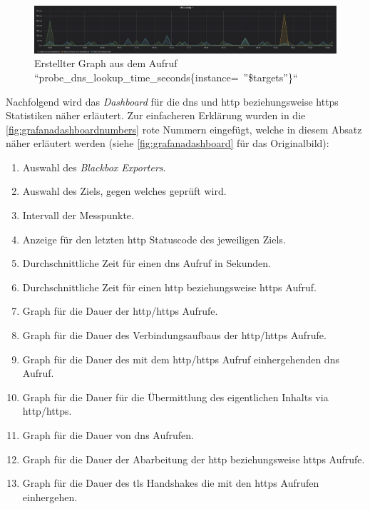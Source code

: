 \documentclass[titlepage]{report}
\begin{document}
\begin{figure}[H]
    \centering
    \includegraphics[width=1.0\textwidth]{figures/grafana_graph.png}
    \caption{Erstellter Graph aus dem Aufruf ``probe\_dns\_lookup\_time\_seconds\{instance=~''\$targets''\}``}\label{fig:grafanagraph}
\end{figure}
Nachfolgend wird das \emph{Dashboard} für die \gls{dns} und \gls{http}
beziehungsweise \gls{https} Statistiken näher erläutert.
Zur einfacheren Erklärung wurden in die
\autoref{fig:grafanadashboardnumbers}
rote Nummern eingefügt, welche in diesem Absatz näher erläutert werden
(siehe \autoref{fig:grafanadashboard} für das Originalbild):
\begin{enumerate}
    \item Auswahl des \emph{Blackbox Exporters}.
    \item Auswahl des Ziels, gegen welches geprüft wird.
    \item Intervall der Messpunkte.
    \item Anzeige für den letzten \gls{http} Statuscode des jeweiligen Ziels.
    \item Durchschnittliche Zeit für einen \gls{dns} Aufruf in Sekunden.
    \item Durchschnittliche Zeit für einen \gls{http} beziehungsweise \gls{https} Aufruf.
    \item Graph für die Dauer der \gls{http}/\gls{https} Aufrufe.
    \item Graph für die Dauer des Verbindungsaufbaus der \gls{http}/\gls{https} Aufrufe.
    \item Graph für die Dauer des mit dem \gls{http}/\gls{https} Aufruf einhergehenden \gls{dns} Aufruf.
    \item Graph für die Dauer für die Übermittlung des eigentlichen Inhalts via \gls{http}/\gls{https}.
    \item Graph für die Dauer von \gls{dns} Aufrufen.
    \item Graph für die Dauer der Abarbeitung der \gls{http} beziehungsweise \gls{https} Aufrufe.
    \item Graph für die Dauer des \gls{tls} Handshakes die mit den \gls{https} Aufrufen einhergehen.
\end{enumerate}
\end{document}
